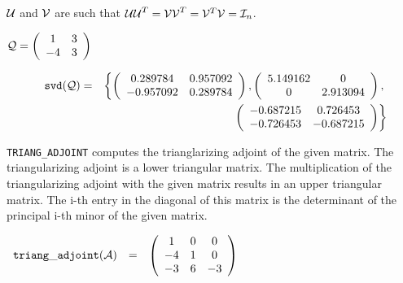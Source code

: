 ${\cal U}$ and ${\cal V}$ are such that ${\cal UU}^T = {\cal VV}^T = 
{\cal V}^T {\cal V} = {\cal I}_n$.
\begin{flushleft}
\hspace*{0.175in}
\begin{math}  
{\cal Q} = \left( \begin{array}{cc} 1 & 3 \\ -4 & 3 
\end{array} \right)
\end{math}  
\end{flushleft}

\begin{eqnarray}
\hspace*{0.1in}
{\tt svd({\cal Q})} & = & 
\left\{ 
        \left( \begin{array}{cc} 0.289784 & 0.957092 \\ -0.957092 & 
0.289784 \end{array} \right), \left( \begin{array}{cc} 5.149162 & 0 \\ 
0 & 2.913094 \end{array} \right), \right. \nonumber \\ & & \left. \: \; 
\, \left( \begin{array}{cc} -0.687215 & 0.726453 \\ -0.726453 & 
-0.687215 \end{array} \right)       
\right\} \nonumber
\end{eqnarray}

{\tt TRIANG\_ADJOINT} computes the trianglarizing adjoint of
the given matrix. The triangularizing adjoint is a lower triangular matrix. The
multiplication of the triangularizing adjoint with the given matrix results in an
upper triangular matrix. The i-th entry in the diagonal of this matrix is the
determinant of the principal i-th minor of the given matrix.

\begin{flushleft}  
\hspace*{0.1in}
\begin{math}  
\begin{array}{ccc}
{\tt triang\_adjoint}({\cal A}) & = & 
        \left( \begin{array}{ccc} 1 & 0 & 0 \\ -4 & 1 & 0 \\ -3 & 6 & -3 
 \end{array} \right) 
\end{array}
\end{math}  
\end{flushleft}

